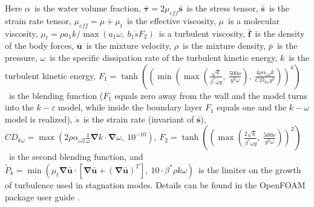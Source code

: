 \documentclass[mathematics,article,submit,pdftex,moreauthors]{Definitions/mdpi}
\begin{document}
Here $\alpha$~is the water volume fraction, $\bar{\boldsymbol{\tau}} = 2 \mu_{eff} \bar{\boldsymbol{s}}$~is the stress tensor, $\bar{\boldsymbol{s}}$~is the strain rate tensor, $\mu_{eff} = \mu + \mu_t$~is the effective viscosity, $\mu$~is a molecular viscosity, $\mu_t = \rho a_1 k / \max(a_1 \omega, \ b_1 \dot{s} F_2)$~is a turbulent viscosity, $\bar{\boldsymbol{f}}$~is the density of the body forces, $\bar{\boldsymbol{u}}$~is the mixture velocity, $\rho$~is the mixture density, $\bar{p}$~is the pressure, $\omega$~is the specific dissipation rate of the turbulent kinetic energy, $k$~is the turbulent kinetic energy, $F_1 = \tanh \left( \left( \min\left( \max \left( \frac{\sqrt{k}}{\beta^* \omega y},\ \frac{500 \nu}{y^2 \omega} \right),\ \frac{4 \rho \alpha_{\omega 2} k}{CD_{k \omega} y^2} \right) \right)^4 \right)$~is the blending function ($F_1$ equals zero away from the wall and the model turns into the $k-\varepsilon$ model, while inside the boundary layer $F_1$ equals one and the $k-\omega$ model is realized),  $\dot{s}$~is the strain rate (invariant of $\overline{\boldsymbol{s}}$), $CD_{k\omega} = \max \left( 2 \rho \alpha_{\omega 2} \frac{1}{\omega} \boldsymbol{\nabla} k \cdot \boldsymbol{\nabla} \omega,\ 10^{-10} \right)$, $F_2 = \tanh \left( \left( \max \left( \frac{2 \sqrt{k}}{\beta^* \omega y},\ \frac{500 \nu}{y^2 \omega} \right) \right)^2 \right)$~is the second blending function, and $\widetilde{P}_k = \min (\mu_t \boldsymbol{\nabla} \bar{\boldsymbol{u}} \cdot \left[ \boldsymbol{\nabla} \bar{\boldsymbol{u}} + (\boldsymbol{\nabla} \bar{\boldsymbol{u}})^T\right],\ 10 \cdot \beta^* \rho k \omega)$~is the limiter on the growth of turbulence used in stagnation modes. Details can be found in the OpenFOAM package user guide \cite{OFUG}.
\end{document}
